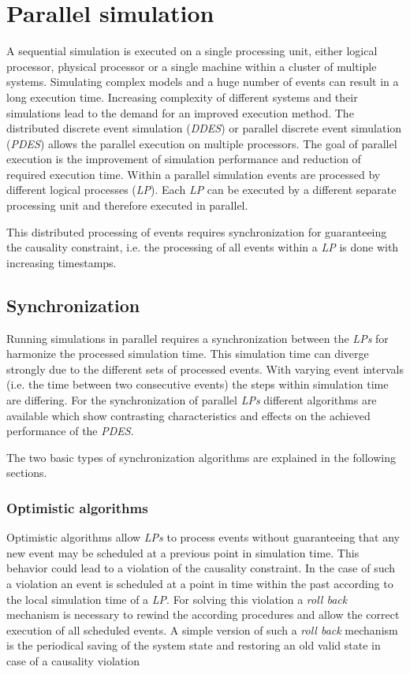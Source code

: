\chapter{Parallel simulation}
\label{cha:parallel_sim}
A sequential simulation is executed on a single processing unit, either logical processor, physical processor or a single machine within a cluster of multiple systems.
Simulating complex models and a huge number of events can result in a long execution time.
Increasing complexity of different systems and their simulations lead to the demand for an improved execution method.
The distributed discrete event simulation (\emph{DDES}) or parallel discrete event simulation (\emph{PDES}) allows the parallel execution on multiple processors.
The goal of parallel execution is the improvement of simulation performance and reduction of required execution time.
Within a parallel simulation events are processed by different logical processes (\emph{LP}).
Each \emph{LP} can be executed by a different separate processing unit and therefore executed in parallel. \cite{bagrodia_parsec:_1998}

This distributed processing of events requires synchronization for guaranteeing the causality constraint, i.e. the processing of all events within a \emph{LP} is done with increasing timestamps.

\section{Synchronization}
\label{sec:parallel_synchronization}
Running simulations in parallel requires a synchronization between the \emph{LPs} for harmonize the processed simulation time.
This simulation time can diverge strongly due to the different sets of processed events.
With varying event intervals (i.e. the time between two consecutive events) the steps within simulation time are differing.
For the synchronization of parallel \emph{LPs} different algorithms are available which show contrasting characteristics and effects on the achieved performance of the \emph{PDES}. \cite[chapter 2]{bagrodia_performance_2000}

The two basic types of synchronization algorithms are explained in the following sections.

\subsection{Optimistic algorithms}
\label{sec:parallel_synchronization_optimistic}
Optimistic algorithms allow \emph{LPs} to process events without guaranteeing that any new event may be scheduled at a previous point in simulation time.
This behavior could lead to a violation of the causality constraint.
In the case of such a violation an event is scheduled at a point in time within the past according to the local simulation time of a \emph{LP}.
For solving this violation a \emph{roll back} mechanism is necessary to rewind the according procedures and allow the correct execution of all scheduled events.
A simple version of such a \emph{roll back} mechanism is the periodical saving of the system state and restoring an old valid state in case of a causality violation \cite{bagrodia_parsec:_1998}
    
